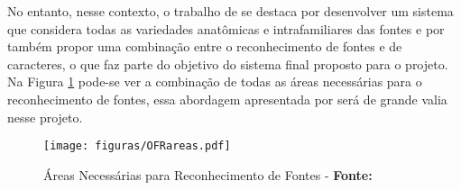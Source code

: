 No entanto, nesse contexto, o trabalho de  se destaca por desenvolver um sistema que considera todas as variedades anatômicas e intrafamiliares das fontes e por também propor uma combinação entre o reconhecimento de fontes e de caracteres, o que faz parte do objetivo do sistema final proposto para o projeto. Na Figura \ref{fig:OFRareas} pode-se ver a combinação de todas as áreas necessárias para o reconhecimento de fontes, essa abordagem apresentada por  será de grande valia nesse projeto.

\begin{figure}[H]
  \centering
  \texttt{[image: figuras/OFRareas.pdf]}
  \caption{Áreas Necessárias para Reconhecimento de Fontes - \textbf{Fonte:} }
  \label{fig:OFRareas}
\end{figure}









